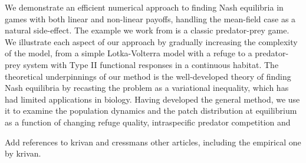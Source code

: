 We demonstrate an efficient numerical approach to finding Nash equilibria in games with both linear and non-linear payoffs, handling the mean-field case as a natural side-effect. The example we work from is a classic predator-prey game. We illustrate each aspect of our approach by gradually increasing the complexity of the model, from a simple Lotka-Volterra model with a refuge to a predator-prey system with Type II functional responses in a continuous habitat. The theoretical underpinnings of our method is the well-developed theory of finding Nash equilibria by recasting the problem as a variational inequality, which has had limited applications in biology. Having developed the general method, we use it to examine the population dynamics and the patch distribution at equilibrium as a function of changing refuge quality, intraspecific predator competition and

Add references to krivan and cressmans other articles, including the empirical one by krivan.
